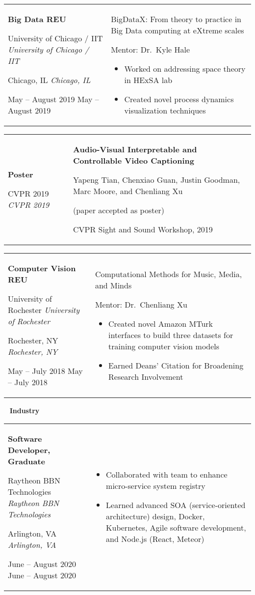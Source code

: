 \documentclass[11pt,letterpaper]{article}
\newcommand{\sect}[1]{
\begin{center}
	\noindent\xrfill[0.7ex]{0.5pt} \mbox{ } {\Large \bf #1} \mbox{ } \xrfill[0.7ex]{0.5pt}
\end{center}
}
\newcommand{\entry}[5]{
	\noindent
	\begin{tabular}{p{2in} p{\dimexpr \linewidth-2\tabcolsep-2.25in}} %
		\noindent \textbf{#1}
		
		\ifx #2  \else \noindent \textit{#2} \fi
		
		\ifx #3  \else \noindent \textit{#3} \fi
		
		\ifx #4  \else \noindent #4 \fi
		&
		#5
	\end{tabular}
	\vspace{0.5cm}
}
\begin{document}
	
	\entry{Big Data REU}{University of Chicago / IIT}{Chicago, IL}{May -- August 2019}{
		BigDataX: From theory to practice in Big Data computing at eXtreme scales
		
		Mentor: Dr.\ Kyle Hale

		\begin{itemize}[itemsep=0pt, nosep, wide]
			\item Worked on addressing space theory in HExSA lab
			\item Created novel process dynamics visualization techniques
		\end{itemize}
	}
	
	
	\entry{Poster}{CVPR 2019}{}{}{
		\textbf{Audio-Visual Interpretable and Controllable Video Captioning}
		
		Yapeng Tian, Chenxiao Guan, Justin Goodman, Marc Moore, and Chenliang Xu
		
		(paper accepted as poster)
		
		CVPR Sight and Sound Workshop, 2019
	}
	
	\entry{Computer Vision REU}{University of Rochester}{Rochester, NY}{May -- July 2018}{
		Computational Methods for Music, Media, and Minds
		
		Mentor: Dr.\ Chenliang Xu
		
		\begin{itemize}[nosep, wide]
			\item Created novel Amazon MTurk interfaces to build three datasets for training computer vision models
			\item Earned Deans' Citation for Broadening Research Involvement
		\end{itemize}
	}
	
	\pagebreak
	\sect{Industry}
	
	\entry{Software Developer, Graduate}{Raytheon BBN Technologies}{Arlington, VA}{June -- August 2020}{
		\vspace{-5mm}
		\begin{itemize}[itemsep=0pt, wide]
			\item Collaborated with team to enhance micro-service system registry
			\item Learned advanced SOA (service-oriented architecture) design, Docker, Kubernetes, Agile software development, and Node.js (React, Meteor)
		\end{itemize}
	}
	
\end{document}
